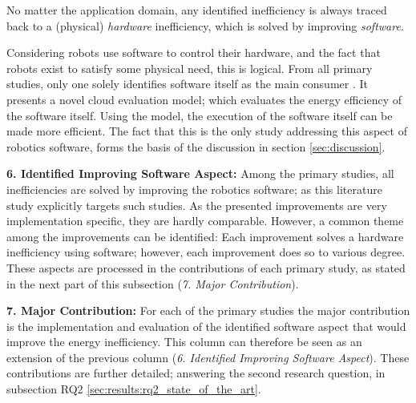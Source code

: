 \vspace{2mm}

No matter the application domain, any identified inefficiency is always traced back to a (physical) \textit{hardware} inefficiency, 
which is solved by improving \textit{software}.

\vspace{2mm}

Considering robots use software to control their hardware, and the fact that robots exist to satisfy some physical need, this is logical.
From all primary studies, only one solely identifies software itself as the main consumer \cite{hou2017novel_cloud_evaluation_model}.
It presents a novel cloud evaluation model; which evaluates the energy efficiency of the software itself.
Using the model, the execution of the software itself can be made more efficient. 
The fact that this is the only study addressing this aspect of robotics software, forms the basis of the discussion in section \ref{sec:discussion}.

\vspace{5mm}

\noindent\textbf{6. Identified Improving Software Aspect:}
Among the primary studies, all inefficiencies are solved by improving the robotics software;
as this literature study explicitly targets such studies.
As the presented improvements are very implementation specific, they are hardly comparable.
However, a common theme among the improvements can be identified:
Each improvement solves a hardware inefficiency using software; however, each improvement does so to various degree. 
These aspects are processed in the contributions of each primary study, 
as stated in the next part of this subsection (\textit{7. Major Contribution}).

\newpage

\noindent\textbf{7. Major Contribution:}
For each of the primary studies the major contribution is the implementation and evaluation of the identified software aspect that would
improve the energy inefficiency. 
This column can therefore be seen as an extension of the previous column (\textit{6. Identified Improving Software Aspect}).
These contributions are further detailed; answering the second research question, in subsection RQ2 \ref{sec:results:rq2_state_of_the_art}.

\vspace{5mm}

